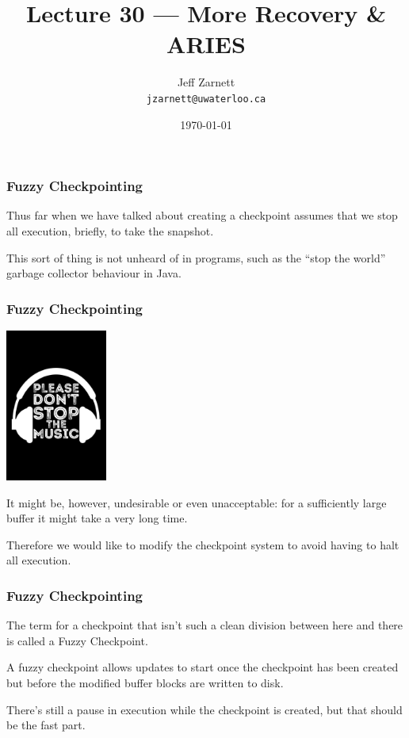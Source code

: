 

\title{Lecture 30 --- More Recovery \& ARIES }

\author{Jeff Zarnett \\ \small \texttt{jzarnett@uwaterloo.ca}}
\date{\today}




\begin{frame}
  \titlepage

 \end{frame}


\begin{frame}
\frametitle{Fuzzy Checkpointing}

Thus far when we have talked about creating a checkpoint assumes that we stop all execution, briefly, to take the snapshot. 

This sort of thing is not unheard of in programs, such as the ``stop the world'' garbage collector behaviour in Java. 

 \end{frame}


\begin{frame}
\frametitle{Fuzzy Checkpointing}

\begin{center}
	\includegraphics[width=0.25\textwidth]{images/stopthemusic.jpg}
\end{center}


It might be, however, undesirable or even unacceptable: for a sufficiently large buffer it might take a very long time. 

Therefore we would like to modify the checkpoint system to avoid having to halt all execution.


\end{frame}

\begin{frame}
\frametitle{Fuzzy Checkpointing}

The term for a checkpoint that isn't such a clean division between here and there is called a \alert{Fuzzy Checkpoint}. 

A fuzzy checkpoint allows updates to start once the checkpoint has been created but before the modified buffer blocks are written to disk. 

There's still a pause in execution while the checkpoint is created, but that should be the fast part.


\end{frame}

